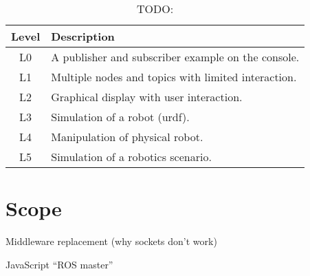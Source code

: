         \begin{table}[htbp]
            \centering	
            \caption{TODO:}
                \begin{tabular}{cl}
                    \toprule
                    \textbf{Level} & \textbf{Description} \\
                    \midrule
                    L0 & A publisher and subscriber example on the console. \\ [0.3em]
                    L1 & Multiple nodes and topics with limited interaction. \\[0.3em]
                    L2 & Graphical display with user interaction. \\[0.3em]
                    L3 & Simulation of a robot (urdf). \\[0.3em]
                    L4 & Manipulation of physical robot. \\[0.3em]
                    L5 & Simulation of a robotics scenario. \\
                \bottomrule
            \end{tabular}\label{tab:techlevels}
        \end{table}

\section{Scope}

    Middleware replacement (why sockets don't work)

    JavaScript ``ROS master''

